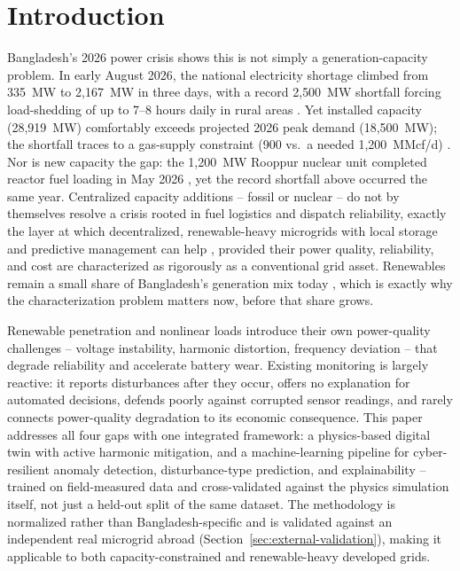 \documentclass[conference,a4paper]{IEEEtran}
\begin{document}
\section{Introduction}

Bangladesh's 2026 power crisis shows this is not simply a
generation-capacity problem. In early August 2026, the national
electricity shortage climbed from 335~MW to 2{,}167~MW in three days,
with a record 2{,}500~MW shortfall forcing load-shedding of up to
7--8 hours daily in rural areas \cite{dailystar2026loadshedding,
dailysun2026rural}. Yet installed capacity (28{,}919~MW) comfortably
exceeds projected 2026 peak demand (18{,}500~MW); the shortfall traces
to a gas-supply constraint (900 vs.\ a needed 1{,}200~MMcf/d)
\cite{dailystar2026pdbplan}. Nor is new capacity the gap: the
1{,}200~MW Rooppur nuclear unit completed reactor fuel loading in May
2026 \cite{dailystar2026rooppur,tbs2026rooppur}, yet the record
shortfall above occurred the same year. Centralized capacity additions
-- fossil or nuclear -- do not by themselves resolve a crisis rooted
in fuel logistics and dispatch reliability, exactly the layer at which
decentralized, renewable-heavy microgrids with local storage and
predictive management can help \cite{hossain2026bdmicrogrids},
provided their power quality, reliability, and cost are characterized
as rigorously as a conventional grid asset. Renewables remain a small
share of Bangladesh's generation mix today \cite{akash2024bdrenewables},
which is exactly why the characterization problem matters now, before
that share grows.

Renewable penetration and nonlinear loads introduce their own
power-quality challenges -- voltage instability, harmonic distortion,
frequency deviation -- that degrade reliability and accelerate
battery wear. Existing monitoring is largely reactive: it reports
disturbances after they occur, offers no explanation for automated
decisions, defends poorly against corrupted sensor readings, and
rarely connects power-quality degradation to its economic consequence.
This paper addresses all four gaps with one integrated framework: a
physics-based digital twin with active harmonic mitigation, and a
machine-learning pipeline for cyber-resilient anomaly detection,
disturbance-type prediction, and explainability -- trained on
field-measured data and cross-validated against the physics simulation
itself, not just a held-out split of the same dataset. The
methodology is normalized rather than Bangladesh-specific and is
validated against an independent real microgrid abroad
(Section~\ref{sec:external-validation}), making it applicable to both
capacity-constrained and renewable-heavy developed grids.
\end{document}
